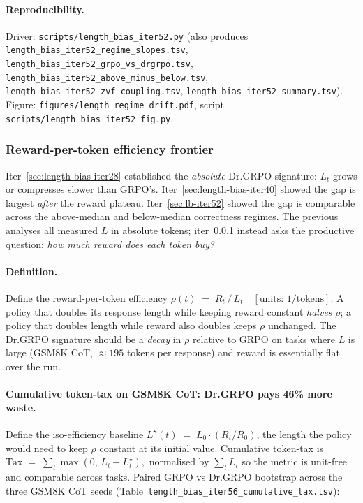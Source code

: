 \documentclass{article}
\begin{document}
\paragraph{Reproducibility.}
Driver: \texttt{scripts/length\_bias\_iter52.py} (also produces
\texttt{length\_bias\_iter52\_regime\_slopes.tsv},
\texttt{length\_bias\_iter52\_grpo\_vs\_drgrpo.tsv},
\texttt{length\_bias\_iter52\_above\_minus\_below.tsv},
\texttt{length\_bias\_iter52\_zvf\_coupling.tsv},
\texttt{length\_bias\_iter52\_summary.tsv}).
Figure: \texttt{figures/length\_regime\_drift.pdf},
script \texttt{scripts/length\_bias\_iter52\_fig.py}.
 

\subsubsection{Reward-per-token efficiency frontier}\label{sec:lb-iter56}

Iter~\ref{sec:length-bias-iter28} established the \emph{absolute} Dr.GRPO signature:
$L_t$ grows or compresses slower than GRPO's. Iter~\ref{sec:length-bias-iter40}
showed the gap is largest \emph{after} the reward plateau. Iter~\ref{sec:lb-iter52}
showed the gap is comparable across the above-median and below-median
correctness regimes. The previous analyses all measured $L$ in absolute
tokens; iter~\ref{sec:lb-iter56} instead asks the productive question:
\emph{how much reward does each token buy?}

\paragraph{Definition.}
Define the reward-per-token efficiency
$\rho(t) \;=\; R_t \,/\, L_t \quad [\text{units: } 1/\text{tokens}].$
A policy that doubles its response length while keeping reward constant
\emph{halves} $\rho$; a policy that doubles length while reward also
doubles keeps $\rho$ unchanged. The Dr.GRPO signature should be a
\emph{decay} in $\rho$ relative to GRPO on tasks where $L$ is large
(GSM8K CoT, $\approx 195$ tokens per response) and reward is essentially
flat over the run.

\paragraph{Cumulative token-tax on GSM8K CoT: Dr.GRPO pays 46\% more waste.}
Define the iso-efficiency baseline $L^\star(t) \;=\; L_0 \cdot (R_t / R_0)$,
the length the policy would need to keep $\rho$ constant at its
initial value. Cumulative token-tax is
$\mathrm{Tax} \;=\; \sum_t \max(0,\, L_t - L^\star_t),$
normalised by $\sum_t L_t$ so the metric is unit-free and comparable
across tasks. Paired GRPO vs Dr.GRPO bootstrap across the three GSM8K
CoT seeds (Table~\texttt{length\_bias\_iter56\_cumulative\_tax.tsv}):
\end{document}
